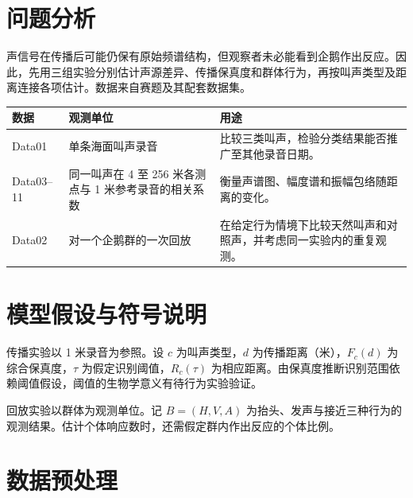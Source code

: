 \documentclass{apmcmthesis}
\begin{document}
\section{问题分析}
声信号在传播后可能仍保有原始频谱结构，但观察者未必能看到企鹅作出反应。因此，先用三组实验分别估计声源差异、传播保真度和群体行为，再按叫声类型及距离连接各项估计。数据来自赛题及其配套数据集\cite{problem,data}。
\begin{center}\small
\begin{tabular}{p{.17\linewidth}p{.32\linewidth}p{.39\linewidth}}
\toprule 数据 & 观测单位 & 用途\\\midrule
Data01 & 单条海面叫声录音 & 比较三类叫声，检验分类结果能否推广至其他录音日期。\\
Data03--11 & 同一叫声在 4 至 256 米各测点与 1 米参考录音的相关系数 & 衡量声谱图、幅度谱和振幅包络随距离的变化。\\
Data02 & 对一个企鹅群的一次回放 & 在给定行为情境下比较天然叫声和对照声，并考虑同一实验内的重复观测。\\\bottomrule
\end{tabular}\end{center}
\section{模型假设与符号说明}
传播实验以 1 米录音为参照。设 $c$ 为叫声类型，$d$ 为传播距离（米），$F_c(d)$ 为综合保真度，$\tau$ 为假定识别阈值，$R_c(\tau)$ 为相应距离。由保真度推断识别范围依赖阈值假设，阈值的生物学意义有待行为实验验证。

回放实验以群体为观测单位。记 $B=(H,V,A)$ 为抬头、发声与接近三种行为的观测结果。估计个体响应数时，还需假定群内作出反应的个体比例。
\begingroup
\edef\previousTableCount{\arabic{table}}
\setcounter{table}{0}
\renewcommand{\thetable}{\arabic{section}-\arabic{table}}
\section{数据预处理}
\end{document}
